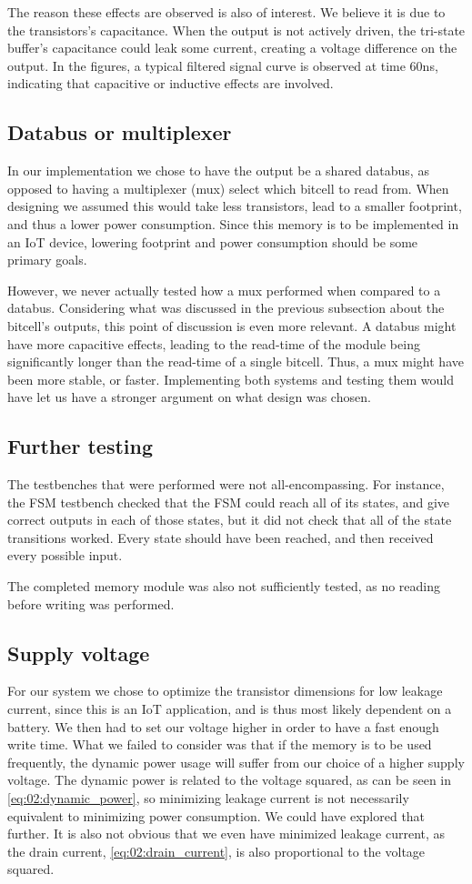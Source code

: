 The reason these effects are observed is also of interest. We believe it is due to the transistors's capacitance. When the output is not actively driven, the tri-state buffer's capacitance could leak some current, creating a voltage difference on the output. In the figures, a typical filtered signal curve is observed at time 60ns, indicating that capacitive or inductive effects are involved.

\subsection{Databus or multiplexer}
In our implementation we chose to have the output be a shared databus, as opposed to having a multiplexer (mux) select which bitcell to read from. When designing we assumed this would take less transistors, lead to a smaller footprint, and thus a lower power consumption. Since this memory is to be implemented in an IoT device, lowering footprint and power consumption should be some primary goals.

However, we never actually tested how a mux performed when compared to a databus. Considering what was discussed in the previous subsection about the bitcell's outputs, this point of discussion is even more relevant. A databus might have more capacitive effects, leading to the read-time of the module being significantly longer than the read-time of a single bitcell. Thus, a mux might have been more stable, or faster. Implementing both systems and testing them would have let us have a stronger argument on what design was chosen.

\subsection{Further testing}
The testbenches that were performed were not all-encompassing. For instance, the FSM testbench checked that the FSM could reach all of its states, and give correct outputs in each of those states, but it did not check that all of the state transitions worked. Every state should have been reached, and then received every possible input.

The completed memory module was also not sufficiently tested, as no reading before writing was performed.  

\subsection{Supply voltage}
For our system we chose to optimize the transistor dimensions for low leakage current, since this is an IoT application, and is thus most likely dependent on a battery. We then had to set our voltage higher in order to have a fast enough write time. What we failed to consider was that if the memory is to be used frequently, the dynamic power usage will suffer from our choice of a higher supply voltage. The dynamic power is related to the voltage squared, as can be seen in \autoref{eq:02:dynamic_power}, so minimizing leakage current is not necessarily equivalent to minimizing power consumption. We could have explored that further. It is also not obvious that we even have minimized leakage current, as the drain current, \autoref{eq:02:drain_current}, is also proportional to the voltage squared.

